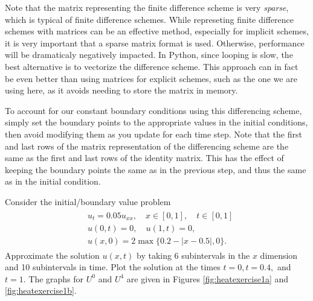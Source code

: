\begin{info}
Note that the matrix representing the finite difference scheme is very \emph{sparse}, which is typical of finite difference schemes.
While represeting finite difference schemes with matrices can be an effective method, especially for implicit schemes, it is very important that a sparse matrix format is used.
Otherwise, performance will be dramaticaly negatively impacted.
In Python, since looping is slow, the best alternative is to vectorize the difference scheme.
This approach can in fact be even better than using matrices for explicit schemes, such as the one we are using here, as it avoids needing to store the matrix in memory.
\end{info}

To account for our constant boundary conditions using this differencing scheme, simply set the boundary points to the appropriate values in the initial conditions, then avoid modifying them as you update for each time step.
Note that the first and last rows of the matrix representation of the differencing scheme are the same as the first and last rows of the identity matrix.
This has the effect of keeping the boundary points the same as in the previous step, and thus the same as in the initial condition.

\begin{problem}
\label{prob:heat_exercise1}
Consider the initial/boundary value problem
\begin{align}
	\begin{split}
	&{ } u_t = 0.05 u_{xx}, \quad x \in [0,1], \quad t \in [0,1]\\
	&{ } u(0,t) = 0,\quad u(1,t) = 0,\\
	&{ } u(x,0) = 2\max\{0.2 - |x-0.5|,0\}.
	\end{split}
\end{align}
Approximate the solution $u(x,t)$ by taking 6 subintervals in the $x$ dimension and 10 subintervals in time.
Plot the solution at the times \(t=0, t=0.4,\) and \(t=1\).
The graphs for $U^0$ and $U^{4}$ are given in Figures \ref{fig:heatexercise1a} and \ref{fig:heatexercise1b}.
\end{problem}

